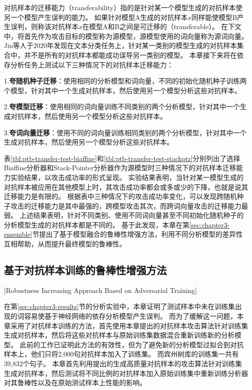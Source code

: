 对抗样本的迁移能力（transferability）指的是针对某一个模型生成的对抗样本使另一个模型产生误判的能力。
如果针对模型A生成的对抗样本$x$同样能使模型B产生误判，则称该对抗样本$x$在模型A和B之间是可迁移的（transferable）。
在下文中，将首先作为攻击目标的模型称为源模型，源模型使用的词向量称为源词向量。
Jin等人\cite{jin-etal-2020-isbert}于2020年发现在文本分类任务上，针对某一类别的模型生成的对抗样本集合中，并不是所有的对抗样本都能成功误导另一类别的模型。
本章接下来将在依存分析任务上测试以下三种情况下的对抗样本迁移能力：

1.\textbf{夸随机种子迁移}：使用相同的分析模型和词向量，不同的初始化随机种子训练两个模型，针对其中一个生成对抗样本，然后使用另一个模型分析这些对抗样本。

2.\textbf{夸模型迁移}：使用相同的词向量训练不同类别的两个分析模型，针对其中一个生成对抗样本，然后使用另一个模型分析这些对抗样本。

3.\textbf{夸词向量迁移}：使用不同的词向量训练相同类别的两个分析模型，针对其中一个生成对抗样本，然后使用另一个模型分析这些对抗样本。

表\ref{tbl:ptb-transfer-test-biaffine}和\ref{tbl:ptb-transfer-test-stackptr}分别列出了选择Biaffine分析器和Stack-Pointer分析器作为源模型时三种情况下的对抗样本迁移能力实验结果，以攻击成功率的形式呈现。
实验结果表明，当针对某一模型生成的对抗样本被应用在其他模型上时，其攻击成功率都会或多或少的下降，也就是说其迁移能力是有限的。
根据表中三种情况下的攻击成功率变化，可以发现跨随机种子攻击的迁移能力是其中最强的，跨模型攻击其次，而跨词向量攻击的迁移能力最弱。
上述结果表明，针对不同类别、使用不同词向量甚至不同初始化随机种子的分析模型生成的对抗样本都是不同的。
基于此发现，本章在第\ref{sec:chapter3-ensemble}节提出了基于模型融合的鲁棒性增强方法，利用不同分析模型的差异性互相帮助，从而提升最终模型的鲁棒性。


\subsection{基于对抗样本训练的鲁棒性增强方法}[Robustness Increasing Approach Based on Adversarial Training]
\label{sec:chapter3-adv-training}

在第\ref{sec:chapter3-results}节的分析实验中，本章证明了测试样本中未在训练集出现的词容易使基于神经网络的依存分析模型产生误判。
而为了缓解这一问题，本章采用了对抗样本训练的方法，首先使用本章提出的对抗样本攻击算法针对训练集生成对抗样本，然后将这些对抗样本与原始训练集数据混合重新训练新的分析模型。
此前的工作\cite{han-etal-2020-adversarial}已证明此方法的有效性，但为了避免新的分析模型过拟合到对抗样本上，他们只将2,000句对抗样本加入了训练集。
而宾州树库的训练集一共有39,832个句子。
本章首先利用提出的生成高质量对抗样本的攻击算法针对训练集生成对抗样本，然后测试将不同比例的对抗样本加入原始训练集中重新训练分析器对其鲁棒性以及在原始测试样本上性能的影响。

